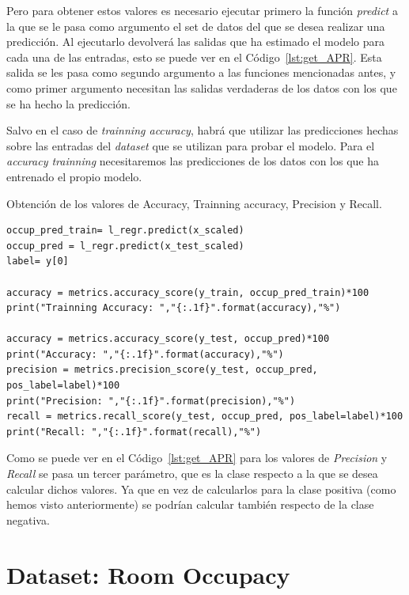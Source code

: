\documentclass[a4paper, 12pt]{book}
\begin{document}
Pero para obtener estos valores es necesario ejecutar primero la función \textit{predict} a la que se le pasa como argumento el set de datos del que se desea realizar una predicción. Al ejecutarlo devolverá las salidas que ha estimado el modelo para cada una de las entradas, esto se puede ver en el Código~\ref{lst:get_APR}. Esta salida se les pasa como segundo argumento a las funciones mencionadas antes, y como primer argumento necesitan las salidas verdaderas de los datos con los que se ha hecho la predicción. 

Salvo en el caso de \textit{trainning accuracy}, habrá que utilizar las predicciones hechas sobre las entradas del \textit{dataset} que se utilizan para probar el modelo. Para el \textit{accuracy trainning} necesitaremos las predicciones de los datos con los que ha entrenado el propio modelo.

\begin{listing}[htb]
    \caption{Obtención de los valores de Accuracy, Trainning accuracy, Precision y Recall.}{}
    \label{lst:get_APR}
    \begin{verbatim}
occup_pred_train= l_regr.predict(x_scaled)
occup_pred = l_regr.predict(x_test_scaled)    
label= y[0]

accuracy = metrics.accuracy_score(y_train, occup_pred_train)*100
print("Trainning Accuracy: ","{:.1f}".format(accuracy),"%")

accuracy = metrics.accuracy_score(y_test, occup_pred)*100
print("Accuracy: ","{:.1f}".format(accuracy),"%")
precision = metrics.precision_score(y_test, occup_pred, pos_label=label)*100
print("Precision: ","{:.1f}".format(precision),"%")
recall = metrics.recall_score(y_test, occup_pred, pos_label=label)*100
print("Recall: ","{:.1f}".format(recall),"%")
    \end{verbatim}
\end{listing}

Como se puede ver en el Código~\ref{lst:get_APR} para los valores de \textit{Precision} y \textit{Recall} se pasa un tercer parámetro, que es la clase respecto a la que se desea calcular dichos valores. Ya que en vez de calcularlos para la clase positiva (como hemos visto anteriormente) se podrían calcular también respecto de la clase negativa.

\section{Dataset: Room Occupacy}
\label{sec:dataSet_Occupancy}
\end{document}
